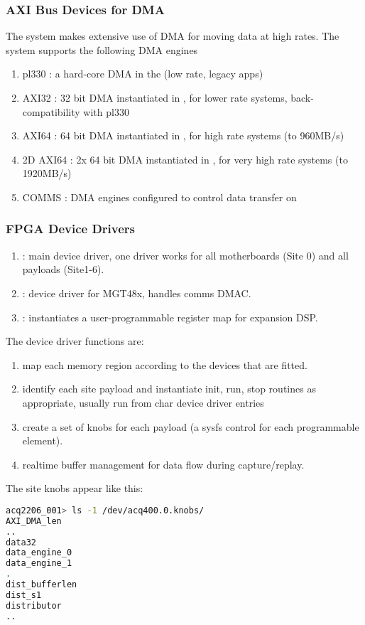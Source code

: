 \documentclass[]{article}
\begin{document}
\subsubsection{AXI Bus Devices for DMA}
The  system makes extensive use of DMA for moving data at high rates. The system supports the following DMA engines
\begin{enumerate}
    \item pl330 : a hard-core DMA in the  (low rate, legacy apps)  
    \item AXI32 : 32 bit  DMA instantiated in , for lower rate systems, back-compatibility with pl330
    \item AXI64 : 64 bit  DMA instantiated in , for high rate systems (to 960MB/s)
    \item 2D AXI64 : 2x 64 bit  DMA instantiated in , for very high rate systems (to 1920MB/s)
    \item COMMS : DMA engines configured to control data transfer on 
\end{enumerate}

\subsubsection{FPGA Device Drivers}
\begin{enumerate}
	\item {} : main device driver, one driver works for all motherboards (Site 0) and all payloads (Site1-6).
	\item {}    : device driver for MGT48x, handles comms DMAC.
	\item {} : instantiates a user-programmable register map for expansion DSP.
\end{enumerate}
The  device driver functions are:
\begin{enumerate}
	\item map each memory region according to the devices that are fitted.
	\item identify each site payload and instantiate init, run, stop routines as appropriate, usually run from char device driver entries
	\item create a set of knobs for each payload (a sysfs control for each programmable element).
	\item realtime buffer management for data flow during capture/replay.
\end{enumerate}
The site knobs appear like this:
\begin{lstlisting}[language=bash,style=bashstyle,frame=single]
acq2206_001> ls -1 /dev/acq400.0.knobs/
AXI_DMA_len
..
data32
data_engine_0
data_engine_1
.
dist_bufferlen
dist_s1
distributor
..
\end{lstlisting}
\end{document}

